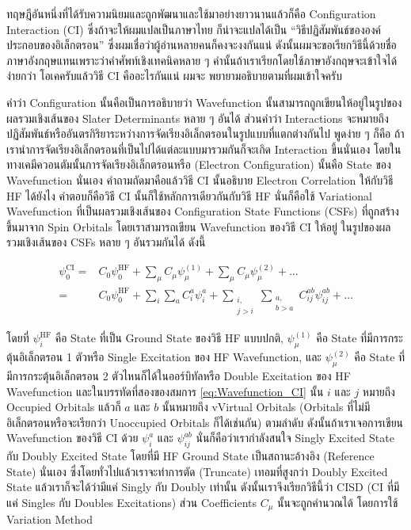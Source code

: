 ทฤษฎีอันหนึ่งที่ได้รับความนิยมและถูกพัฒนาและใช้มาอย่างยาวนานแล้วก็คือ Configuration Interaction (CI) ซึ่งถ้าจะให้ผมแปลเป็นภาษาไทย%
ก็น่าจะแปลได้เป็น \enquote{วิธีปฏิสัมพันธ์ขององค์ประกอบของอิเล็กตรอน} ซึ่งผมเชื่อว่าผู้อ่านหลายคนก็คงจะงงกันแน่ ดังนั้นผมจะขอเรียกวิธีนี้ด้วยชื่อ%
ภาษาอังกฤษแทนเพราะว่าคำศัพท์เชิงเทคนิคหลาย ๆ คำนั้นถ้าเราเรียกโดยใช้ภาษาอังกฤษจะเข้าใจได้ง่ายกว่า โอเคครับแล้ววิธี CI คืออะไรกันแน่ ผมจะ%
พยายามอธิบายตามที่ผมเข้าใจครับ

คำว่า Configuration นั้นคือเป็นการอธิบายว่า Wavefunction นั้นสามารถถูกเขียนให้อยู่ในรูปของผลรวมเชิงเส้นของ Slater Determinants
หลาย ๆ อันได้ ส่วนคำว่า Interactions จะหมายถึงปฏิสัมพันธ์หรืออันตรกิริยาระหว่างการจัดเรียงอิเล็กตรอนในรูปแบบที่แตกต่างกันไป พูดง่าย ๆ ก็คือ%
ถ้าเรานำการจัดเรียงอิเล็กตรอนที่เป็นไปได้แต่ละแบบมารวมกันก็จะเกิด Interaction ขึ้นนั่นเอง โดยในทางเคมีควอนตัมนั้นการจัดเรียงอิเล็กตรอนหรือ
(Electron Configuration) นั้นคือ State ของ Wavefunction นั่นเอง คำถามถัดมาคือแล้ววิธี CI นั้นอธิบาย Electron Correlation
ให้กับวิธี HF ได้ยังไง คำตอบก็คือวิธี CI นั้นก็ใช้หลักการเดียวกันกับวิธี HF นั่นก็คือใช้ Variational Wavefunction ที่เป็นผลรวมเชิงเส้นของ
Configuration State Functions (CSFs) ที่ถูกสร้างขึ้นมาจาก Spin Orbitals โดยเราสามารถเขียน Wavefunction ของวิธี CI ให้อยู่%
ในรูปของผลรวมเชิงเส้นของ CSFs หลาย ๆ อันรวมกันได้ ดังนี้

\begin{equation}
  \label{eq:Wavefunction_CI}
  \begin{aligned}
    \psi_0^{\mathrm{CI}}
    = & C_0 \psi_0^{\mathrm{HF}}
    + \sum_\mu C_\mu \psi_\mu^{(1)}
    + \sum_\mu C_\mu \psi_\mu^{(2) }
    + \ldots                     \\
    = & C_0 \psi_0^{\mathrm{HF}}
    +\sum_i \sum_a C_i^a \psi_i^a
    + \sum_{\substack{i,         \\ j>i}} \sum_{\substack{a, \\ b>a}} C_{i j}^{a b} \psi_{i j}^{a b}
    + \ldots
  \end{aligned}
\end{equation}

\noindent โดยที่ $\psi_i^{\mathrm{HF}}$ คือ State ที่เป็น Ground State ของวิธี HF แบบปกติ, $\psi_\mu^{(1)}$ คือ State
ที่มีการกระตุ้นอิเล็กตรอน 1 ตัวหรือ Single Excitation ของ HF Wavefunction, และ $\psi_\mu^{(2)}$ คือ State ที่มีการกระตุ้นอิเล็กตรอน
2 ตัวไหนก็ได้ในออร์บิทัลหรือ Double Excitation ของ HF Wavefunction และในบรรทัดที่สองของสมการ \eqref{eq:Wavefunction_CI} นั้น
$i$ และ $j$ หมายถึง Occupied Orbitals แล้วก็ $a$ และ $b$ นั้นหมายถึง vVirtual Orbitals (Orbitals ที่ไม่มีอิเล็กตรอนหรือจะเรียกว่า
Unoccupied Orbitals ก็ได้เช่นกัน) ตามลำดับ ดังนั้นถ้าเราเจอการเขียน Wavefunction ของวิธี CI ด้วย $\psi_i^a$ และ $\psi_{i j}^{a b}$
นั่นก็คือว่าเรากำลังสนใจ Singly Excited State กับ Doubly Excited State โดยที่มี HF Ground State เป็นสถานะอ้างอิง (Reference
State) นั่นเอง ซึ่งโดยทั่วไปแล้วเราจะทำการตัด (Truncate) เทอมที่สูงกว่า Doubly Excited State แล้วเราก็จะได้ว่ามีแค่ Singly กับ Doubly
เท่านั้น ดังนั้นเราจึงเรียกวิธีนี้ว่า CISD (CI ที่มีแค่ Singles กับ Doubles Excitations) ส่วน Coefficients $C_\mu$ นั้นจะถูกคำนวณได้%
โดยการใช้ Variation Method

